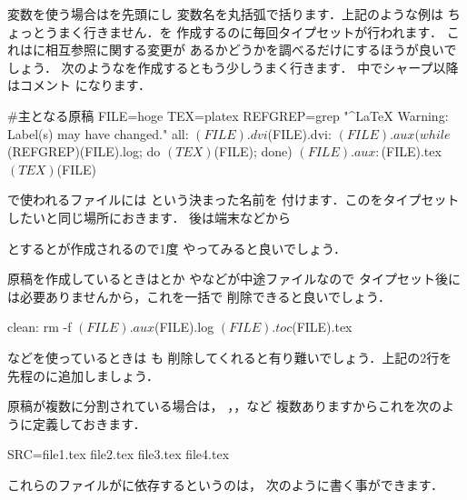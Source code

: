 

変数を使う場合は\qu{\texttt{\$}}を先頭にし
変数名を丸括弧で括ります．上記のような例は
ちょっとうまく行きません．を
作成するのに毎回タイプセットが行われます．
これはに相互参照に関する変更が
あるかどうかを調べるだけにするほうが良いでしょう．
次のようなを作成するともう少しうまく行きます．
中でシャープ\qu{\str{#}}以降はコメント
になります．

\begin{Makefile}
#主となる原稿
FILE=hoge
TEX=platex
REFGREP=grep "^LaTeX Warning: Label(s) may have changed."
all: $(FILE).dvi
$(FILE).dvi: $(FILE).aux
	(while $(REFGREP)$ $(FILE).log; do $(TEX) $(FILE); done)
$(FILE).aux: $(FILE).tex
	$(TEX) $(FILE)
\end{Makefile}

で使われるファイルには
という決まった名前を
付けます．このをタイプセット
したいと同じ場所におきます．
後は端末などから
\begin{InTerm}
\end{InTerm}
とするとが作成されるので1度
やってみると良いでしょう．

原稿を作成しているときはとか
やなどが中途ファイルなので
タイプセット後には必要ありませんから，これを一括で
削除できると良いでしょう．

\begin{Makefile}
clean:	
	rm -f $(FILE).aux $(FILE).log $(FILE).toc $(FILE).tex~
\end{Makefile}

などを使っているときは も
削除してくれると有り難いでしょう．上記の2行を
先程のに追加しましょう．

原稿が複数に分割されている場合は，
，，など
複数ありますからこれを次のように定義しておきます．

\begin{Makefile}
SRC=file1.tex file2.tex file3.tex file4.tex 
\end{Makefile}

これらのファイルがに依存するというのは，
次のように書く事ができます．%

